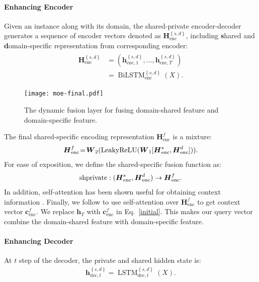 \documentclass[11pt,a4paper]{article}
\newcommand{\LeakyReLU}{{\rm{LeakyReLU}}}
\newcommand{\shprivate}{{\rm{shprivate}}}
\begin{document}
\paragraph{Enhancing Encoder}
Given an instance along with its domain, the shared-private encoder-decoder generates a sequence of encoder vectors denoted as $\boldsymbol{H}_{\text{enc}}^{\left\{ s,d \right\}}$,  including \textbf{s}hared and \textbf{d}omain-specific representation from corresponding encoder:
\begin{eqnarray}
\label{Eq:private_encoder}
\begin{aligned}
\boldsymbol{H}_{\text{enc}}^{\left\{ s,d \right\}}&\!=\!(\boldsymbol{h}_{\text{enc}, 1}^{\left\{ s,d \right\}},\dots,\boldsymbol{h}_{\text{enc}, T}^{\left\{ s,d \right\}})\\ 
&\!=\!\operatorname{BiLSTM}_{\text{enc}}^{\left\{ s,d \right\}}({X}).
\end{aligned}
\end{eqnarray}
\begin{figure}[t]
	\centering
	\texttt{[image: moe-final.pdf]}
	\caption{
		The dynamic fusion layer for fusing domain-shared feature and domain-specific feature.
	}
	\label{fig:knowledge_transfer}
\end{figure}
The final shared-specific encoding representation $	\boldsymbol{H}_{\text{enc}}^{f}$ is a mixture:
\begin{eqnarray}
	\boldsymbol{H}_{\text{enc}}^{f}\!=\!\boldsymbol{W}_{2}(\LeakyReLU(\boldsymbol{W}_{1}[\boldsymbol{H}_{\text{enc}}^{s}, \boldsymbol{H}_{\text{enc}}^{d}])).
\end{eqnarray}
For ease of exposition, we define the shared-specific fusion function as:
\begin{eqnarray}
\shprivate : (\boldsymbol{H}_{\text{enc}}^{s}, \boldsymbol{H}_{\text{enc}}^{d})  \rightarrow \boldsymbol{H}_\text{enc}^{f}.
\end{eqnarray}
In addition, self-attention has been shown useful for obtaining context information \cite{zhong-etal-2018-global}.
Finally, we follow  to use self-attention over $\boldsymbol{H}_{\text{enc}}^{f}$ to get context vector $\boldsymbol{c}_{\text{enc}}^{f}$.
We replace $\boldsymbol{h}_{T}$ with $\boldsymbol{c}_{\text{enc}}^{f}$ in Eq.~\ref{initial}.
This makes our query vector combine the domain-shared feature with domain-specific feature.

\paragraph{Enhancing Decoder}
At $t$ step of the decoder, the private and shared hidden state is:
\begin{eqnarray}
\label{Eq:private_encoder}
\boldsymbol{h}_{{\text{dec}, t}}^{\left\{ s,d \right\}}= \operatorname{LSTM}_{{\text{dec}, t}}^{\left\{ s,d \right\}}({X}).
\end{eqnarray}
\end{document}
